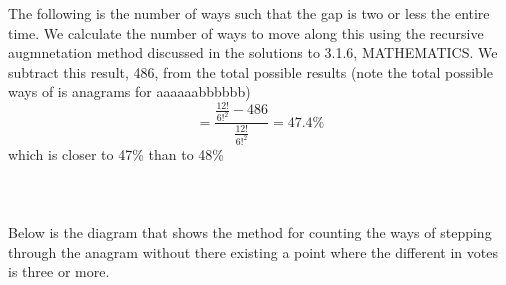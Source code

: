 \documentclass[12pt,letterpaper,boxed]{hmcpset}
\begin{document}
\begin{solution}
The following is the number of ways such that the gap is two or less the entire time. 
We calculate the number of ways to move along this using the recursive augmnetation method discussed in the solutions to 3.1.6, MATHEMATICS. We subtract this result, 486, from the total possible results (note the total possible ways of is anagrams for aaaaaabbbbbb)
$$=\frac{\frac{12!}{6!^2}-486}{\frac{12!}{6!^2}} = 47.4\%$$ which is closer to 47\% than to 48\%
\\
\\
\\
\\

Below is the diagram that shows the method for counting the ways of stepping through the anagram without there existing a point where the different in votes is three or more.
\end{solution}
\end{document}
